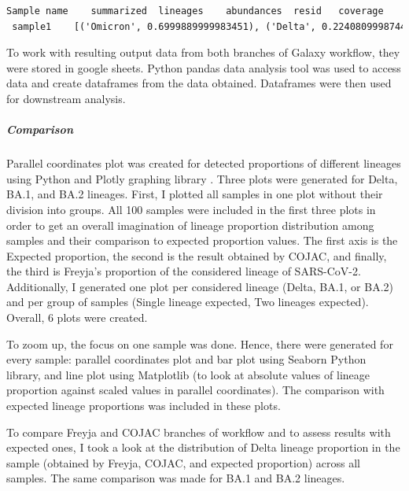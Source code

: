                 \begin{lstlisting}[language=xml, caption=Freyja output for sample 1 from mock dataset, label=list:methods:freyja-s1]
 Sample name	summarized	lineages	abundances	resid	coverage
 sample1 	[('Omicron', 0.6999889999983451), ('Delta', 0.22408099987442534), ('Other', 0.07552100018490182)]	BA.1.18 AY.4 BA.1.19 BA.1.1.13 BA.1.15.1 AY.38 BA.1.9 BA.1.16 B B.1.617.2 B.1.1.529 XS	0.23943700 0.11764700 0.11363600 0.10000000 0.09667000 0.06944400 0.06686400 0.06474800 0.06122400 0.03699000 0.01863400 0.01429700	7.611495978	99.95971667
                \end{lstlisting}
                
                To work with resulting output data from both branches of Galaxy workflow, they were stored in google sheets. Python pandas data analysis tool \cite{pandas2022} was used to access data and create dataframes from the data obtained. Dataframes were then used for downstream analysis.

                \subparagraph{Comparison}
                Parallel coordinates plot was created for detected proportions of different lineages using Python and Plotly graphing library \cite{plotly}. Three plots were generated for Delta, BA.1, and BA.2 lineages. First, I plotted all samples in one plot without their division into groups. All 100 samples were included in the first three plots in order to get an overall imagination of lineage proportion distribution among samples and their comparison to expected proportion values. The first axis is the Expected proportion, the second is the result obtained by COJAC, and finally, the third is Freyja’s proportion of the considered lineage of SARS-CoV-2. Additionally, I generated one plot per considered lineage (Delta, BA.1, or BA.2) and per group of samples (Single lineage expected, Two lineages expected). Overall, 6 plots were created. 

                To zoom up, the focus on one sample was done. Hence, there were generated for every sample: parallel coordinates plot and bar plot using Seaborn Python library, and line plot using Matplotlib (to look at absolute values of lineage proportion against scaled values in parallel coordinates). The comparison with expected lineage proportions was included in these plots.
                
                To compare Freyja and COJAC branches of workflow and to assess results with expected ones, I took a look at the distribution of Delta lineage proportion in the sample (obtained by Freyja, COJAC, and expected proportion) across all samples. The same comparison was made for BA.1 and BA.2 lineages.
                
